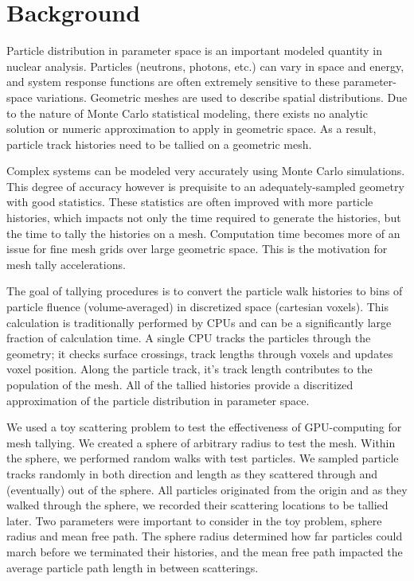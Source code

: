 
\section{Background}
Particle distribution in parameter space is an important modeled quantity in
nuclear analysis. Particles (neutrons, photons, etc.) can vary in space and
energy, and system response functions are often extremely sensitive to these
parameter-space variations. Geometric meshes are used to describe spatial
distributions. Due to the nature of Monte Carlo statistical modeling, there
exists no analytic solution or numeric approximation to apply in geometric
space. As a result, particle track histories need to be tallied on a geometric
mesh.

Complex systems can be modeled very accurately using Monte Carlo simulations.
This degree of accuracy however is prequisite to an adequately-sampled geometry
with good statistics. These statistics are often improved with more particle
histories, which impacts not only the time required to generate the histories,
but the time to tally the histories on a mesh. Computation time becomes more of
an issue for fine mesh grids over large geometric space. This is the motivation for mesh
tally accelerations.

The goal of tallying procedures is to convert the particle walk histories
to bins of particle fluence (volume-averaged) in discretized space (cartesian
voxels). This calculation is traditionally performed by CPUs and can be a
significantly large fraction of calculation time.
A single CPU tracks the particles through the
geometry; it checks surface crossings, track lengths through voxels and updates
voxel position. Along the particle track, it's track length contributes to the
population of the mesh. All of the tallied histories provide a discritized
approximation of the particle distribution in parameter space.

We used a toy scattering problem to test the effectiveness of GPU-computing for
mesh tallying. We created a sphere of arbitrary radius to test the mesh. Within
the sphere, we performed random walks with test particles. We sampled particle
tracks randomly in both direction and length as they scattered through and
(eventually) out of the sphere. All particles originated from the origin and
as they  walked through
the sphere, we recorded their scattering locations to be tallied later. Two
parameters were important to consider in the toy problem, sphere radius and mean
free path. The sphere radius determined how far particles could march before we
terminated their histories, and the mean free path impacted the average particle
path length in between scatterings.

